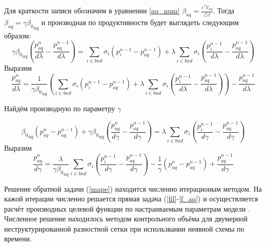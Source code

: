 \documentclass[14pt]{article}
\begin{document}
Для краткости записи обозначим в уравнении \ref{aq_num} $ \beta_{aq} = \frac{c^* V_{aq}}{\bigtriangleup t} $. Тогда $ \beta_{aq} = \gamma{\beta_0}_{aq} $ и производная по продуктивности будет выглядеть следующим образом:
\begin{equation} \label{eq_aq_dlambda}
\gamma{\beta_0}_{aq}\left(\frac{p_{aq}^n}{d\lambda}  -\frac{p_{aq}^{n-1}}{d\lambda}\right) =\sum_{i \in bnd}\sigma_i(p^{n-1}_i-p_{aq}^{n-1}) +  \lambda\sum_{i \in bnd}\sigma_i(\frac{p^{n-1}_i}{d\lambda}-\frac{p_{aq}^{n-1}}{d\lambda})
\end{equation}
Выразим
\begin{equation} \label{eq_aq_dlambda}
\frac{p_{aq}^n}{d\lambda} =\frac{1}{\gamma{\beta_0}_{aq}}\left(\sum_{i \in bnd}\sigma_i(p^{n-1}_i-p_{aq}^{n-1}) +  \lambda\sum_{i \in bnd}\sigma_i(\frac{p^{n-1}_i}{d\lambda}-\frac{p_{aq}^{n-1}}{d\lambda})\right) -\frac{p_{aq}^{n-1}}{d\lambda}
\end{equation}

Найдём производную по параметру $ \gamma $ 



\begin{equation} \label{eq_aq_dgamma}
{\beta_0}_{aq}(p_{aq}^n - p_{aq}^{n-1}) + \gamma{\beta_0}_{aq} \left(\frac{p_{aq}^n}{d\gamma}  -\frac{p_{aq}^{n-1}}{d\gamma}\right) = \lambda\sum_{i \in bnd}\sigma_i(\frac{p^{n-1}_i}{d\gamma}-\frac{p_{aq}^{n-1}}{d\gamma})
\end{equation}
Выразим
\begin{equation} \label{eq_dpaq_dgamm}
\frac{p_{aq}^n}{d\gamma}   = \frac{\lambda}{\gamma{\beta_0}_{aq} }\sum_{i \in bnd}\sigma_i\left(\frac{p^{n-1}_i}{d\gamma}-\frac{p_{aq}^{n-1}}{d\gamma}\right) - \frac{1}{\gamma}\left(p_{aq}^n - p_{aq}^{n-1}\right) + \frac{p_{aq}^{n-1}}{d\gamma}
\end{equation}

Решение обратной задачи (\ref{mape}) находится численно итерационым методом. На кажой итерации численно решается прямая задача (\ref{fil}-\ref{f_aq}) и осуществляется расчёт производных целевой функции по настраиваемым параметрам модели \cite{opt}. Численное решение находилось методом контрольного объёма  для двумерной неструктурированной разностной сетки при использвании неявной схемы по времени.
\end{document}
